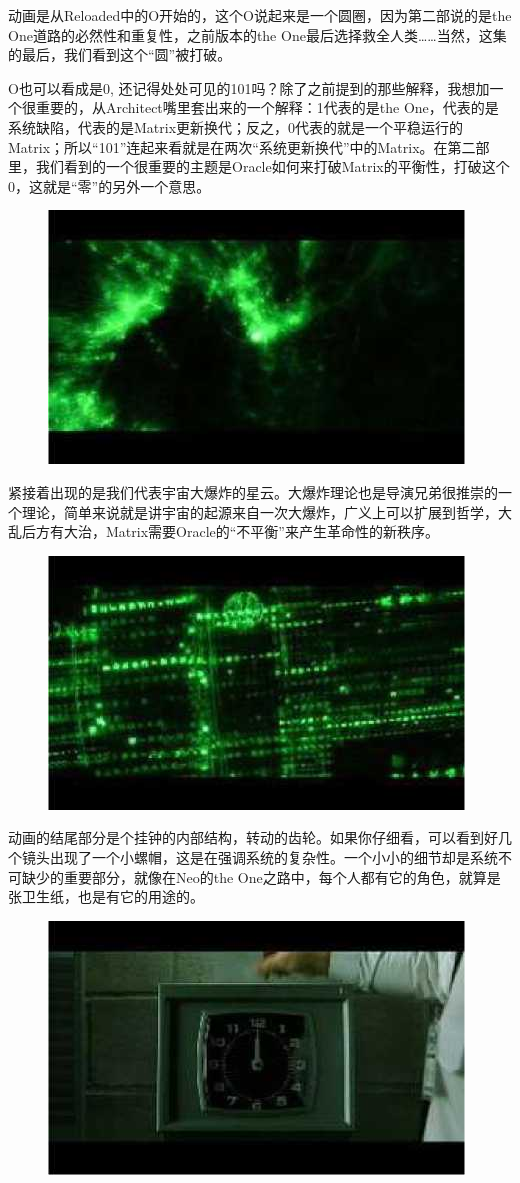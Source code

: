 \documentclass[UTF8]{ctexart}
\begin{document}
动画是从Reloaded中的O开始的，这个O说起来是一个圆圈，因为第二部说的是the One道路的必然性和重复性，之前版本的the One最后选择救全人类……当然，这集的最后，我们看到这个“圆”被打破。

O也可以看成是0, 还记得处处可见的101吗？除了之前提到的那些解释，我想加一个很重要的，从Architect嘴里套出来的一个解释：1代表的是the One，代表的是系统缺陷，代表的是Matrix更新换代；反之，0代表的就是一个平稳运行的Matrix；所以“101”连起来看就是在两次“系统更新换代”中的Matrix。在第二部里，我们看到的一个很重要的主题是Oracle如何来打破Matrix的平衡性，打破这个0，这就是“零”的另外一个意思。

\begin{figure}[htb]
\centering
\includegraphics[width=0.5\linewidth]{fig/read_reloaded-2}
\end{figure}

紧接着出现的是我们代表宇宙大爆炸的星云。大爆炸理论也是导演兄弟很推崇的一个理论，简单来说就是讲宇宙的起源来自一次大爆炸，广义上可以扩展到哲学，大乱后方有大治，Matrix需要Oracle的“不平衡”来产生革命性的新秩序。

\begin{figure}[htb]
\centering
\includegraphics[width=0.5\linewidth]{fig/read_reloaded-3}
\end{figure}

动画的结尾部分是个挂钟的内部结构，转动的齿轮。如果你仔细看，可以看到好几个镜头出现了一个小螺帽，这是在强调系统的复杂性。一个小小的细节却是系统不可缺少的重要部分，就像在Neo的the One之路中，每个人都有它的角色，就算是张卫生纸，也是有它的用途的。

\begin{figure}[htb]
\centering
\includegraphics[width=0.5\linewidth]{fig/read_reloaded-4}
\end{figure}
\end{document}
